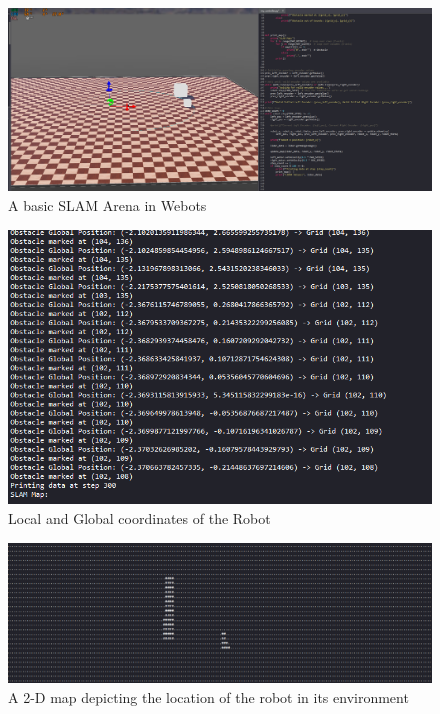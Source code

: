 \begin{figure}[H]
    \centering
    \includegraphics[width=1.0\linewidth]{midpoint_report/assets/images/localisation/slam_arena.png}
    \caption{A basic SLAM Arena in Webots}
    \label{fig: slam_arena image} 
\end{figure}

\begin{figure}[H]
    \centering
    \includegraphics[width=1.0\linewidth]{midpoint_report/assets/images/localisation/coordinates.png}
    \caption{Local and Global coordinates of the Robot}
    \label{fig: coordinates} 
\end{figure}

\begin{figure}[H]
    \centering
    \includegraphics[width=1.0\linewidth]{midpoint_report/assets/images/localisation/map.png}
    \caption{A 2-D map depicting the location of the robot in its environment}
    \label{fig: map} 
\end{figure}



